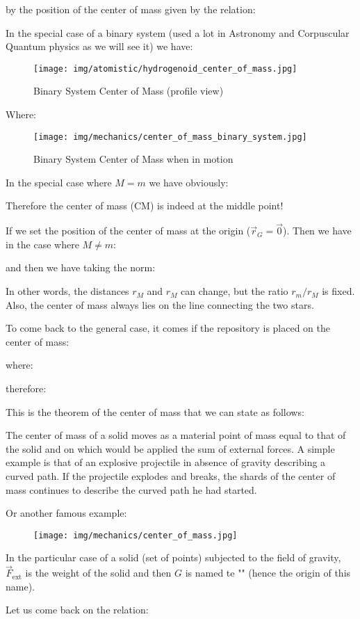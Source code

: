 	by the position of the center of mass given by the relation:
	
	In the special case of a binary system (used a lot in Astronomy and Corpuscular Quantum physics as we will see it) we have:
	\begin{figure}[H]
		\centering
		\texttt{[image: img/atomistic/hydrogenoid\_center\_of\_mass.jpg]}
		\caption{Binary System Center of Mass (profile view)}
	\end{figure}
	Where:
	
	\begin{figure}[H]
		\centering
		\texttt{[image: img/mechanics/center\_of\_mass\_binary\_system.jpg]}
		\caption{Binary System Center of Mass when in motion}
	\end{figure}
	In the special case where $M=m$ we have obviously:
	
	Therefore the center of mass (CM) is indeed at the middle point!
	
	If we set the position of the center of mass at the origin ($\vec{r}_G=\vec{0}$). Then we have in the case where $M\neq m$:
	
	and then we have taking the norm:
	
	In other words, the distances $r_M$ and $r_M$ can change, but the ratio $r_m/r_M$ is fixed. Also, the center of mass always lies on the line connecting the two stars.
	
	To come back to the general case, it comes if the repository is placed on the center of mass:
	
	where:
	
	therefore:
	
	This is the theorem of the center of mass that we can state as follows:
	
	The center of mass of a solid moves as a material point of mass equal to that of the solid and on which would be applied the sum of external forces. A simple example is that of an explosive projectile in absence of gravity describing a curved path. If the projectile explodes and breaks, the shards of the center of mass continues to describe the curved path he had started.
	
	Or another famous example:
	\begin{figure}[H]
		\centering
		\texttt{[image: img/mechanics/center\_of\_mass.jpg]}
	\end{figure}
	\begin{tcolorbox}[title=Remark,colframe=black,arc=10pt]
	In the particular case of a solid (set of points) subjected to the field of gravity, $\vec{F}_\text{ext}$ is the weight of the solid and then $G$ is named te "" (hence the origin of this name).
	\end{tcolorbox}
	Let us come back on the relation:
	
